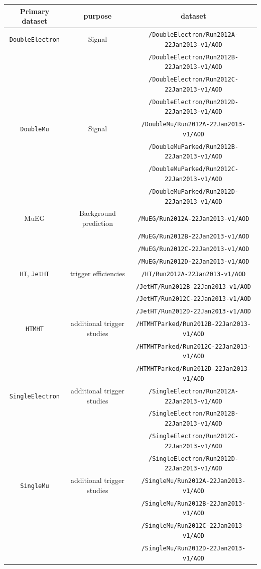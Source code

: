 \begin{table}

\begin{center}
\begin{tabular}{c|c|c}
 Primary dataset & purpose & dataset \\
\hline 
\verb+DoubleElectron+ & Signal & \verb+/DoubleElectron/Run2012A-22Jan2013-v1/AOD+\\
 &  & \verb+/DoubleElectron/Run2012B-22Jan2013-v1/AOD+\\
 &  & \verb+/DoubleElectron/Run2012C-22Jan2013-v1/AOD+\\
 &  & \verb+/DoubleElectron/Run2012D-22Jan2013-v1/AOD+\\
\hline 
\verb+DoubleMu+ & Signal & \verb+/DoubleMu/Run2012A-22Jan2013-v1/AOD+\\
 &  & \verb+/DoubleMuParked/Run2012B-22Jan2013-v1/AOD+\\
 &  & \verb+/DoubleMuParked/Run2012C-22Jan2013-v1/AOD+\\
 &  & \verb+/DoubleMuParked/Run2012D-22Jan2013-v1/AOD+\\
\hline 
MuEG & Background prediction & \verb+/MuEG/Run2012A-22Jan2013-v1/AOD+\\
 &  & \verb+/MuEG/Run2012B-22Jan2013-v1/AOD+\\
 &  & \verb+/MuEG/Run2012C-22Jan2013-v1/AOD+\\
 &  & \verb+/MuEG/Run2012D-22Jan2013-v1/AOD+\\
\hline 
\verb+HT+, \verb+JetHT+ & trigger efficiencies & \verb+/HT/Run2012A-22Jan2013-v1/AOD+\\
 &  & \verb+/JetHT/Run2012B-22Jan2013-v1/AOD+\\
 &  & \verb+/JetHT/Run2012C-22Jan2013-v1/AOD+\\
 &  & \verb+/JetHT/Run2012D-22Jan2013-v1/AOD+\\
\hline 
\verb+HTMHT+ & additional trigger studies & \verb+/HTMHTParked/Run2012B-22Jan2013-v1/AOD+\\
 &  & \verb+/HTMHTParked/Run2012C-22Jan2013-v1/AOD+\\
 &  & \verb+/HTMHTParked/Run2012D-22Jan2013-v1/AOD+\\
\hline 
\verb+SingleElectron+ & additional trigger studies & \verb+/SingleElectron/Run2012A-22Jan2013-v1/AOD+\\
 &  & \verb+/SingleElectron/Run2012B-22Jan2013-v1/AOD+\\
 &  & \verb+/SingleElectron/Run2012C-22Jan2013-v1/AOD+\\
 &  & \verb+/SingleElectron/Run2012D-22Jan2013-v1/AOD+\\
\hline 
\verb+SingleMu+ & additional trigger studies & \verb+/SingleMu/Run2012A-22Jan2013-v1/AOD+\\
 &  & \verb+/SingleMu/Run2012B-22Jan2013-v1/AOD+\\
 &  & \verb+/SingleMu/Run2012C-22Jan2013-v1/AOD+\\
 &  & \verb+/SingleMu/Run2012D-22Jan2013-v1/AOD+\\


\end{tabular}
\end{center}
\end{table}
